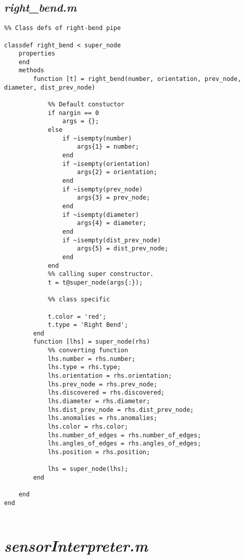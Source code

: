 \subsection{\emph{right\_bend.m}}

\begin{lstlisting}
%% Class defs of right-bend pipe
 
classdef right_bend < super_node
    properties
    end
    methods
        function [t] = right_bend(number, orientation, prev_node, diameter, dist_prev_node)
            
            %% Default constuctor
            if nargin == 0
                args = {};
            else
                if ~isempty(number)
                    args{1} = number;
                end
                if ~isempty(orientation)
                    args{2} = orientation;
                end
                if ~isempty(prev_node)
                    args{3} = prev_node;
                end
                if ~isempty(diameter)
                    args{4} = diameter;
                end
                if ~isempty(dist_prev_node)
                    args{5} = dist_prev_node;
                end
            end    
            %% calling super constructor.
            t = t@super_node(args{:});
            
            %% class specific
            
            t.color = 'red';
            t.type = 'Right Bend';
        end
        function [lhs] = super_node(rhs)
            %% converting function
            lhs.number = rhs.number;
            lhs.type = rhs.type;
            lhs.orientation = rhs.orientation;
            lhs.prev_node = rhs.prev_node;
            lhs.discovered = rhs.discovered;
            lhs.diameter = rhs.diameter;
            lhs.dist_prev_node = rhs.dist_prev_node;
            lhs.anomalies = rhs.anomalies;
            lhs.color = rhs.color;
            lhs.number_of_edges = rhs.number_of_edges;
            lhs.angles_of_edges = rhs.angles_of_edges;
            lhs.position = rhs.position;
            
            lhs = super_node(lhs);            
        end
        
    end
end
 

\end{lstlisting}


\section{\emph{sensorInterpreter.m}}

